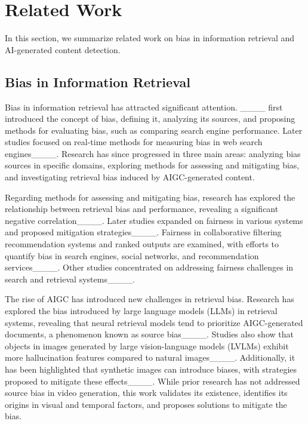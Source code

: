 \section{Related Work}
\label{sec:6}
In this section, we summarize related work on bias in information retrieval and AI-generated content detection.
\subsection{Bias in Information Retrieval}
\label{sec:6.1}

Bias in information retrieval has attracted significant attention. ____ first introduced the concept of bias, defining it, analyzing its sources, and proposing methods for evaluating bias, such as comparing search engine performance. Later studies focused on real-time methods for measuring bias in web search engines____. Research has since progressed in three main areas: analyzing bias sources in specific domains, exploring methods for assessing and mitigating bias, and investigating retrieval bias induced by AIGC-generated content.


Regarding methods for assessing and mitigating bias, research has explored the relationship between retrieval bias and performance, revealing a significant negative correlation____. Later studies expanded on fairness in various systems and proposed mitigation strategies____. Fairness in collaborative filtering recommendation systems and ranked outputs are examined, with efforts to quantify bias in search engines, social networks, and recommendation services____. Other studies concentrated on addressing fairness challenges in search and retrieval systems____.

The rise of AIGC has introduced new challenges in retrieval bias. Research has explored the bias introduced by large language models (LLMs) in retrieval systems, revealing that neural retrieval models tend to prioritize AIGC-generated documents, a phenomenon known as source bias____. Studies also show that objects in images generated by large vision-language models (LVLMs) exhibit more hallucination features compared to natural images____. Additionally, it has been highlighted that synthetic images can introduce biases, with strategies proposed to mitigate these effects____. While prior research has not addressed source bias in video generation, this work validates its existence, identifies its origins in visual and temporal factors, and proposes solutions to mitigate the bias.

